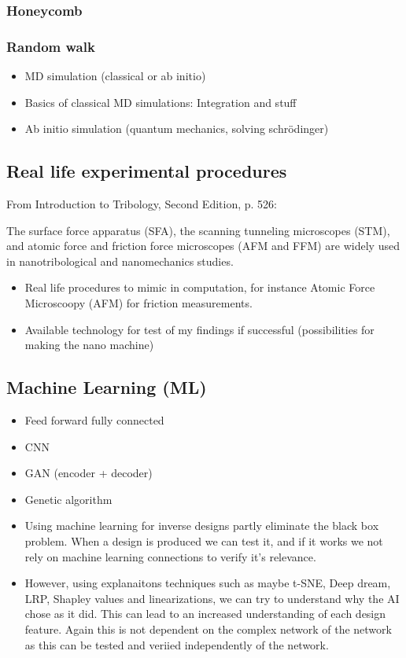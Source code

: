\subsubsection{Honeycomb}
\subsubsection{Random walk}






\begin{itemize}
  \item MD simulation (classical or ab initio)
  \item Basics of classical MD simulations: Integration and stuff
  \item Ab initio simulation (quantum mechanics, solving schrödinger)
\end{itemize}
\subsection{Real life experimental procedures}
From Introduction to Tribology, Second Edition, p. 526: \par
The surface force apparatus (SFA), the scanning tunneling microscopes (STM), and atomic force and friction force microscopes (AFM and FFM) are widely used in nanotribological and nanomechanics studies.



\begin{itemize}
  \item Real life procedures to mimic in computation, for instance Atomic Force Microscoopy (AFM) for friction measurements.
  \item Available technology for test of my findings if successful (possibilities for making the nano machine) 
\end{itemize}
\subsection{Machine Learning (ML)}
\begin{itemize}
  \item Feed forward fully connected
  \item CNN
  \item GAN (encoder + decoder)
  \item Genetic algorithm
  \item Using machine learning for inverse designs partly eliminate the black box problem. When a design is produced we can test it, and if it works we not rely on machine learning connections to verify it's relevance. 
  \item However, using explanaitons techniques such as maybe t-SNE, Deep dream, LRP, Shapley values and linearizations, we can try to understand why the AI chose as it did. This can lead to an increased understanding of each design feature. Again this is not dependent on the complex network of the network as this can be tested and veriied independently of the network. 
\end{itemize}

